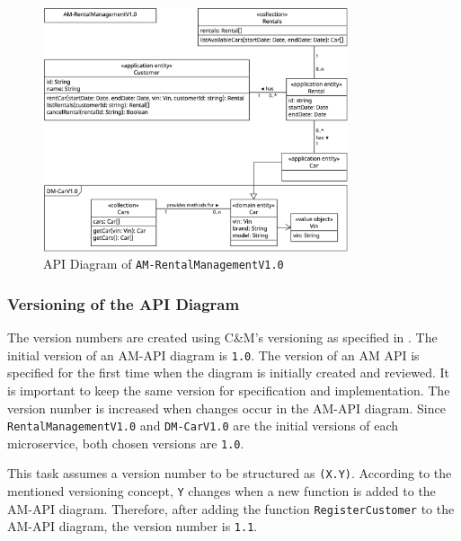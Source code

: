 \begin{figure}
    \centering
    \includegraphics[width=0.8\textwidth]{figures/microservices/rentalManagement/ms_rentalManagement_apiDiagram.png}
    \caption{API Diagram of \texttt{AM-RentalManagementV1.0}}
    \label{fig:ad_am-rental_management_v1.0}
\end{figure}

\subsubsection*{Versioning of the API Diagram}
The version numbers are created using C\&M's versioning as specified in \cite{CM-G-Ver}.
The initial version of an AM-API diagram is \texttt{1.0}.
The version of an AM API is specified for the first time when the diagram is initially created and reviewed.
It is important to keep the same version for specification and implementation.
The version number is increased when changes occur in the AM-API diagram.
Since \texttt{RentalManagementV1.0} and \texttt{DM-CarV1.0} are the initial versions of each microservice, both chosen versions are \texttt{1.0}.

This task assumes a version number to be structured as \texttt{(X.Y)}.
According to the mentioned versioning concept, \texttt{Y} changes when a new function is added to the AM-API diagram.
Therefore, after adding the function \texttt{RegisterCustomer} to the AM-API diagram, the version number is \texttt{1.1}.

